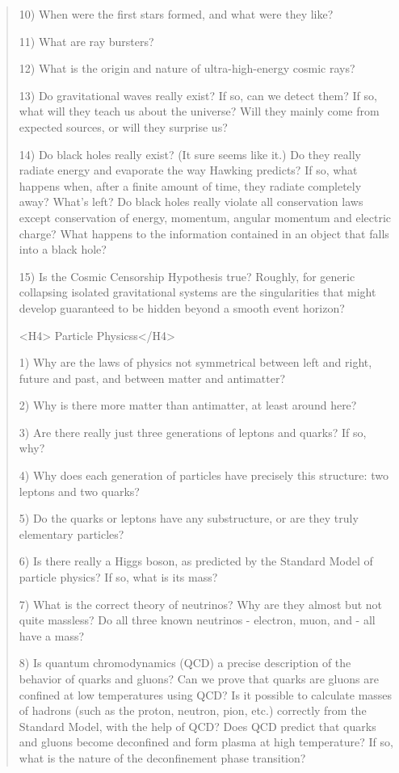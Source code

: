 \begin{quote}
 10) When were the first stars formed, and what were they like?

 11) What are \gamma  ray bursters?

 12) What is the origin and nature of ultra-high-energy cosmic rays?

 13) Do gravitational waves really exist?  If so, can we detect them?  
     If so, what will they teach us about the universe?  Will they 
     mainly come from expected sources, or will they surprise us?

 14) Do black holes really exist?  (It sure seems like it.)
     Do they really radiate energy and evaporate the way Hawking 
     predicts?  If so, what happens when, after a finite amount of 
     time, they radiate completely away?  What's left?  Do black holes 
     really violate all conservation laws except conservation of 
     energy, momentum, angular momentum and electric charge?  What 
     happens to the information contained in an object that falls 
     into a black hole?

 15) Is the Cosmic Censorship Hypothesis true?  Roughly, for generic 
     collapsing isolated gravitational systems are the singularities 
     that might develop guaranteed to be hidden beyond a smooth event 
     horizon?

<H4> Particle Physicss</H4>

 1) Why are the laws of physics not symmetrical between left and 
    right, future and past, and between matter and antimatter?

 2) Why is there more matter than antimatter, at least around here?

 3) Are there really just three generations of leptons and quarks? 
    If so, why?

 4) Why does each generation of particles have precisely this 
    structure: two leptons and two quarks?   

 5) Do the quarks or leptons have any substructure, or are they
    truly elementary particles?

 6) Is there really a Higgs boson, as predicted by the Standard Model 
    of particle physics?   If so, what is its mass? 

 7) What is the correct theory of neutrinos?  Why are they almost but
    not quite massless?  Do all three known neutrinos - electron, muon,
    and \tau  - all have a mass? 

 8) Is quantum chromodynamics (QCD) a precise description of the 
    behavior of quarks and gluons?  Can we prove that quarks are 
    gluons are confined at low temperatures using QCD?  Is it possible 
    to calculate masses of hadrons (such as the proton, neutron, pion, 
    etc.) correctly from the Standard Model, with the help of QCD? 
    Does QCD predict that quarks and gluons become deconfined and form
    plasma at high temperature?  If so, what is the nature of the 
    deconfinement phase transition?
  

\end{quote}
